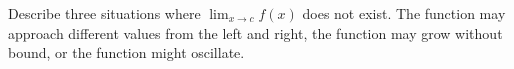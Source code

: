 {Describe three situations where $\displaystyle \lim_{x\to c}f(x)$ does not exist.}
{The function may approach different values from the left and right, the function may grow without bound, or the function might oscillate.}
